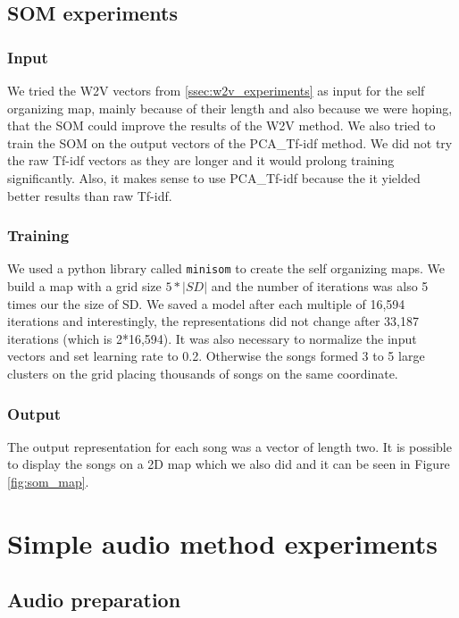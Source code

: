 \subsection{SOM experiments}\label{ssec:som_experiments}

\subsubsection{Input}
We tried the W2V vectors from \ref{ssec:w2v_experiments} as input for the self organizing map, mainly because of their length and also because we were hoping, that the SOM could improve the results of the W2V method. We also tried to train the SOM on the output vectors of the PCA\_Tf-idf method. We did not try the raw Tf-idf vectors as they are longer and it would prolong training significantly. Also, it makes sense to use PCA\_Tf-idf because the it yielded better results than raw Tf-idf.

\subsubsection{Training}
We used a python library called \texttt{minisom} \cite{Vettigli2019} to create the self organizing maps. We build a map with a grid size $5*|SD|$ and the number of iterations was also 5 times our the size of SD. We saved a model after each multiple of 16,594 iterations and interestingly, the representations did not change after 33,187 iterations (which is 2*16,594). It was also necessary to normalize the input vectors and set learning rate to 0.2. Otherwise the songs formed 3 to 5 large clusters on the grid placing thousands of songs on the same coordinate. 

\subsubsection{Output}
The output representation for each song was a vector of length two. It is possible to display the songs on a 2D map which we also did and it can be seen in Figure \ref{fig:som_map}. 

\section{Simple audio method experiments}\label{sec:simple_audio_experiments}

\subsection{Audio preparation}\label{ssec:audio_prep}

